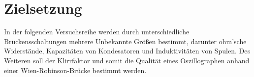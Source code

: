 \section{Zielsetzung}
\label{sec:Zielsetzung}
\nocite{V302}
In der folgenden Versuchsreihe werden durch unterschiedliche Brückensschaltungen mehrere Unbekannte 
Größen bestimmt, darunter ohm'sche Widerstände, Kapazitäten von Kondesatoren und Induktivitäten 
von Spulen. Des Weiteren soll der Klirrfaktor und somit die Qualität eines Oszillographen anhand einer Wien-Robinson-Brücke 
bestimmt werden. 
